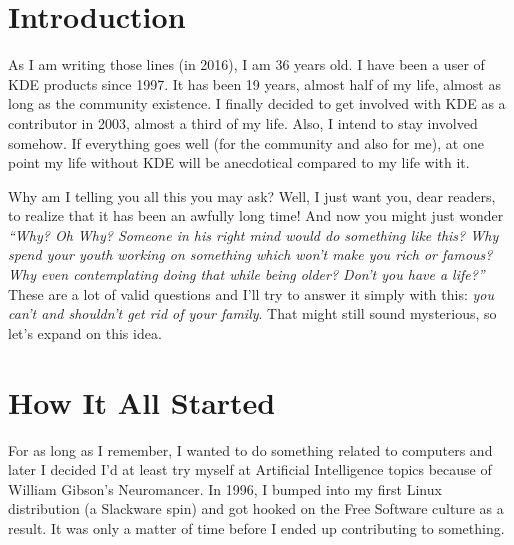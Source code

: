 

\section*{Introduction}
As I am writing those lines (in 2016), I am 36 years old. I have been a user of KDE
products since 1997. It has been 19 years, almost half of my life, almost
as long as the community existence. I finally decided to get involved with KDE
as a contributor in 2003, almost a third of my life. Also, I intend to stay
involved somehow. If everything goes well (for the community and also for me),
at one point my life without KDE will be anecdotical compared to my life with
it.

Why am I telling you all this you may ask? Well, I just want you, dear readers,
to realize that it has been an awfully long time! And now you might just wonder
\emph{``Why? Oh Why? Someone in his right mind would do something like this?
Why spend your youth working on something which won't make you rich or famous?
Why even contemplating doing that while being older? Don't you have a life?''} \\

These are a lot of valid questions and I'll try to answer it simply with this:
\emph{you can't and shouldn't get rid of your family}. That might still sound
mysterious, so let's expand on this idea.

\section*{How It All Started}
For as long as I remember, I wanted to do something related to computers and
later I decided I'd at least try myself at Artificial Intelligence topics because of William Gibson's
Neuromancer. In 1996, I bumped into my first Linux distribution (a Slackware
spin) and got hooked on the Free Software culture as a result. It was only a
matter of time before I ended up contributing to something. \\

